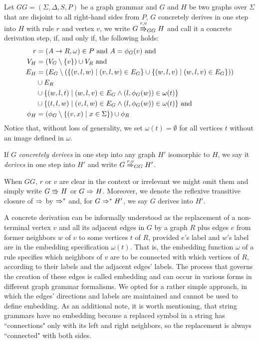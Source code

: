 \documentclass[]{report}
\begin{document}
\begin{definition}
	\label{def:gg_dstep}
	Let $GG = (\Sigma, \Delta, S, P)$ be a graph grammar and $G$ and $H$ be two graphs over $\Sigma$ that are disjoint to all right-hand sides from $P$, $G$ concretely derives in one step into $H$ with rule $r$ and vertex $v$, we write $G \cderiv{r}{v}{GG} H$ and call it a concrete derivation step, if, and only if, the following holds:
	\begin{align*}
		r & = (A \to R, \omega) \in P \text{ and } A = \phi_G(v) \text{ and} \\
		V_H  & = (V_G \setminus \{v\}) \cup V_R \text{ and} \\
		E_H & = (E_G \setminus (\{(v,l,w) \; | \; (v,l,w) \in E_G\} \cup \{(w,l,v) \; | \; (w,l,v) \in E_G\})) \\
		& \cup E_R \\
		& \cup \{(w,l,t) \; | \; (w,l,v) \in E_G \land (l,\phi_G(w)) \in \omega(t)\} \\
		& \cup \{(t,l,w) \; | \; (v,l,w) \in E_G \land (l,\phi_G(w)) \in \omega(t)\} \text{ and} \\
		\phi_H & = (\phi_G \setminus \{(v,x) \; | \; x \in \Sigma \}) \cup \phi_R
	\end{align*}
	Notice that, without loss of generality, we set $\omega(t) = \emptyset$ for all vertices $t$ without an image defined in $\omega$.
	
	If $G$ \textit{concretely derives} in one step into any graph $H'$ isomorphic to $H$, we say it \textit{derives} in one step into $H'$ and write $G \deriv{r}{v}{GG} H'$. 
	
	When $GG$, $r$ or $v$ are clear in the context or irrelevant we might omit them and simply write $G \cderiv{}{}{} H$ or $G \deriv{}{}{} H$. Moreover, we denote the reflexive transitive closure of $\deriv{}{}{}$ by $\Rightarrow^*_{}$ and, for $G \Rightarrow^*_{} H'$, we say $G$ derives into $H'$.
\end{definition}
A concrete derivation can be informally understood as the replacement of a non-terminal vertex $v$ and all its adjacent edges in $G$ by a graph $R$ plus edges $e$ from former neighbors $w$ of $v$ to some vertices $t$ of $R$, provided $e$'s label and $w$'s label are in the embedding specification $\omega(t)$. That is, the embedding function $\omega$ of a rule specifies which neighbors of $v$ are to be connected with which vertices of $R$, according to their labels and the adjacent edges' labels. The process that governs the creation of these edges is called embedding and can occur in various forms in different graph grammar formalisms. We opted for a rather simple approach, in which the edges' directions and labels are maintained and cannot be used to define embedding. As an additional note, it is worth mentioning, that string grammars have no embedding because a replaced symbol in a string has ``connections" only with its left and right neighbors, so the replacement is always ``connected" with both sides.
\end{document}
